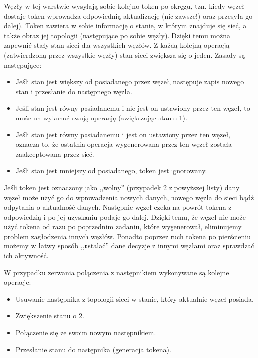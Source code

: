 \par{Węzły w tej warstwie wysyłają sobie kolejno token po okręgu, tzn. kiedy węzeł dostaje token wprowadza odpowiednią aktualizację (nie zawsze!) oraz przesyła go dalej). Token zawiera w sobie informację o stanie, w którym znajduje się sieć, a także obraz jej topologii (następujące po sobie węzły). Dzięki temu można zapewnić stały stan sieci dla wszystkich węzłów. Z każdą kolejną operacją (zatwierdzoną przez wszystkie węzły) stan sieci zwiększa się o jeden. Zasady są następujące:
\begin{itemize}
\item Jeśli stan jest większy od posiadanego przez węzeł, następuje zapis nowego stan i przesłanie do następnego węzła.
\item Jeśli stan jest równy posiadanemu i nie jest on ustawiony przez ten węzeł, to może on wykonać swoją operację (zwiększając stan o 1).
\item Jeśli stan jest równy posiadanemu i jest on ustawiony przez ten węzeł, oznacza to, że ostatnia operacja wygenerowana przez ten węzeł została zaakceptowana przez sieć.
\item Jeśli stan jest mniejszy od posiadanego, token jest ignorowany.
\end{itemize}

\par{Jeśli token jest oznaczony jako ,,wolny'' (przypadek 2 z powyższej listy) dany węzeł może użyć go do wprowadzenia nowych danych, nowego węzła do sieci bądź odpytania o aktualność danych. Następnie węzeł czeka na powrót tokena z odpowiedzią i po jej uzyskaniu podaje go dalej. Dzięki temu, że węzeł nie może użyć tokena od razu po poprzednim zadaniu, które wygenerował, eliminujemy problem zagłodzenia innych węzłów. Ponadto poprzez ruch tokena po pierścieniu możemy w łatwy sposób ,,ustalać'' dane decyzje z innymi węzłami oraz sprawdzać ich aktywność.}

\par{W przypadku zerwania połączenia z następnikiem wykonywane są kolejne operacje:}
\begin{itemize}
\item Usuwanie następnika z topologii sieci w stanie, który aktualnie węzeł posiada.
\item Zwiększenie stanu o 2.
\item Połączenie się ze swoim nowym następnikiem.
\item Przesłanie stanu do następnika (generacja tokena).
\end{itemize}

}

